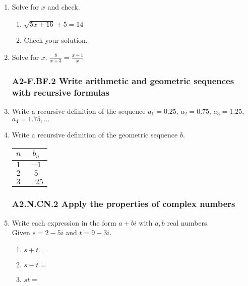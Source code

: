 \documentclass[12pt, twoside]{article}
\begin{document}
\begin{enumerate}[itemsep=0.5cm]
\item Solve for $x$ and check.
    \begin{multicols}{2}
    \begin{enumerate}[itemsep=0.5cm]
        \item  $\sqrt{5x+16} + 5 = 14$
        \item Check your solution.
    \end{enumerate}
    \end{multicols} \vspace{3cm}

\item Solve for $x$. $\displaystyle \frac{8}{x+3} = \frac{x+1}{x}$ \vspace{5cm}


\subsubsection*{A2-F.BF.2 Write arithmetic and geometric sequences with recursive formulas}
\item Write a recursive definition of the sequence $a_1 = 0.25$, $a_2 = 0.75$, $a_3 = 1.25$, $a_4 = 1.75, \ldots$ \vspace{1cm}

\item Write a recursive definition of the geometric sequence $b$. \\[0.5cm]
\renewcommand{\arraystretch}{1.5}
\begin{tabular}{|c|c|}
\hline
$n$ & $b_n$ \\
\hline
$1$ & $-1$ \\
$2$ & $5$ \\
$3$ & $-25$ \\
\hline
\end{tabular} \vspace{1cm}

\subsubsection*{A2.N.CN.2 Apply the properties of complex numbers}
\item Write each expression in the form $a+bi$ with $a,b$ real numbers. \\[0.25cm]
Given  $s = 2 - 5i $ and $t = 9 - 3i$.
    \begin{enumerate}[itemsep=1.5cm]
        \item $s+t =$
        \item $s-t =$
        \item $st =$
    \end{enumerate} \vspace{3cm}
    

\end{enumerate}
\end{document}
